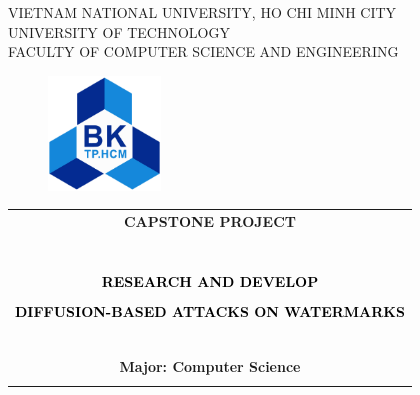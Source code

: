 \documentclass[a4paper]{report}
\begin{document}
\begin{titlepage}
  \begin{center}
    VIETNAM NATIONAL UNIVERSITY, HO CHI MINH CITY\\
    UNIVERSITY OF TECHNOLOGY\\
    FACULTY OF COMPUTER SCIENCE AND ENGINEERING
  \end{center}

  \vspace{1cm}

  \begin{figure}[ht]
    \centering
    \includegraphics[width=3cm]{hcmut.png}
  \end{figure}

  \vspace{1cm}

  \begin{center}
    \begin{tabular}{c}
      \multicolumn{1}{c}{\textbf{{\Large  CAPSTONE PROJECT}}}        \\ \\
      ~~                                                                         \\
      \hline
      \\

      \textcolor{black}{\textbf{{\Large RESEARCH AND DEVELOP}}}                  \\\\
      \textcolor{black}{\textbf{{\Large DIFFUSION-BASED ATTACKS ON WATERMARKS}}} \\
      ~~                                                                         \\
      \hline
      \\
                \textbf{{\fontsize{12pt}{1.5pt} \selectfont Major: Computer Science}}\\[2mm]
      \\
    \end{tabular}
  \end{center}


\end{titlepage}
\end{document}
